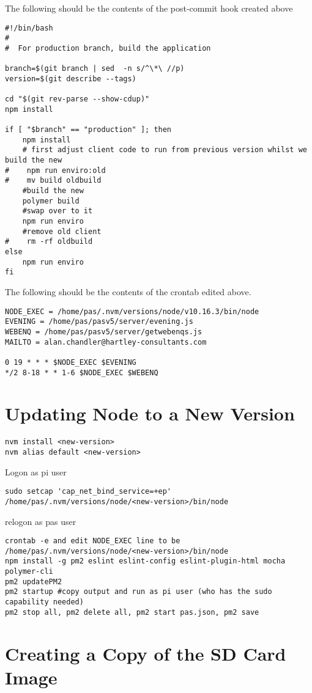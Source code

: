 \documentclass[Draft]{akc}
\begin{document}
The following should be the contents of the post-commit hook created above

\begin{lstlisting}
#!/bin/bash
#
#  For production branch, build the application

branch=$(git branch | sed  -n s/^\*\ //p)
version=$(git describe --tags)

cd "$(git rev-parse --show-cdup)"
npm install

if [ "$branch" == "production" ]; then
    npm install
    # first adjust client code to run from previous version whilst we build the new
#    npm run enviro:old
#    mv build oldbuild
    #build the new
    polymer build
    #swap over to it
    npm run enviro
    #remove old client
#    rm -rf oldbuild
else
    npm run enviro
fi
\end{lstlisting}

The following should be the contents of the crontab edited above.

\begin{lstlisting}
NODE_EXEC = /home/pas/.nvm/versions/node/v10.16.3/bin/node
EVENING = /home/pas/pasv5/server/evening.js
WEBENQ = /home/pas/pasv5/server/getwebenqs.js
MAILTO = alan.chandler@hartley-consultants.com

0 19 * * * $NODE_EXEC $EVENING
*/2 8-18 * * 1-6 $NODE_EXEC $WEBENQ
\end{lstlisting}
\section{Updating Node to a New Version}

\begin{lstlisting}
nvm install <new-version>
nvm alias default <new-version>
\end{lstlisting}
Logon as pi user
\begin{lstlisting}
sudo setcap 'cap_net_bind_service=+ep' /home/pas/.nvm/versions/node/<new-version>/bin/node
\end{lstlisting}
relogon as pas user
\begin{lstlisting}
crontab -e and edit NODE_EXEC line to be /home/pas/.nvm/versions/node/<new-version>/bin/node
npm install -g pm2 eslint eslint-config eslint-plugin-html mocha polymer-cli
pm2 updatePM2
pm2 startup #copy output and run as pi user (who has the sudo capability needed)
pm2 stop all, pm2 delete all, pm2 start pas.json, pm2 save
\end{lstlisting}

\section{Creating a Copy of the SD Card Image}
\end{document}

